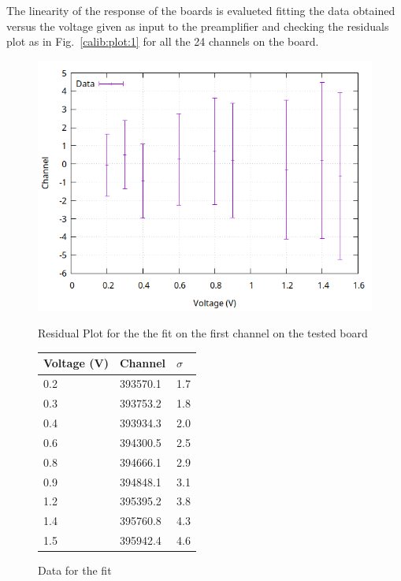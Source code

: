 \bigbreak

The linearity of the response of the boards is evalueted fitting the data obtained versus the voltage given as input to the preamplifier and checking the residuals plot as in Fig.~\ref{calib:plot:1} for all the 24 channels on the board.

\bigbreak

\begin{figure}[th]
  \centering
  \begin{minipage}[b]{0.45\textwidth}
    \includegraphics[width=\textwidth]{img/first_board_line/data_2/calib_1.png}
    \caption{Residual Plot for the the fit on the first channel on the tested board}
    \label{calib:plot:1}
  \end{minipage}
  \hfill
  \begin{minipage}[b]{0.45\textwidth}
  \begin{tabular}{lll}
    Voltage (V) & Channel & $\sigma$ \\
    \midrule
    0.2 & \num{393570.1} & 1.7 \\
    0.3 & \num{393753.2} & 1.8 \\
    0.4 & \num{393934.3} & 2.0 \\
    0.6 & \num{394300.5} & 2.5 \\
    0.8 & \num{394666.1} & 2.9 \\
    0.9 & \num{394848.1} & 3.1 \\
    1.2 & \num{395395.2} & 3.8 \\
    1.4 & \num{395760.8} & 4.3 \\
    1.5 & \num{395942.4} & 4.6 \\
    \bottomrule
  \end{tabular}
  \caption{Data for the fit}
  \label{calib:1}
  \end{minipage}
\end{figure}

